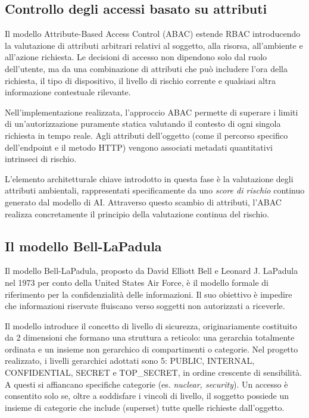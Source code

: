 \subsection{Controllo degli accessi basato su attributi}

Il modello Attribute-Based Access Control (ABAC) estende RBAC introducendo la valutazione di attributi arbitrari relativi al soggetto, alla risorsa, all'ambiente e all'azione richiesta. Le decisioni di accesso non dipendono solo dal ruolo dell'utente, ma da una combinazione di attributi che può includere l'ora della richiesta, il tipo di dispositivo, il livello di rischio corrente e qualsiasi altra informazione contestuale rilevante.

Nell'implementazione realizzata, l'approccio ABAC permette di superare i limiti di un'autorizzazione puramente statica valutando il contesto di ogni singola richiesta in tempo reale. Agli attributi dell'oggetto (come il percorso specifico dell'endpoint e il metodo HTTP) vengono associati metadati quantitativi intrinseci di rischio. 

L'elemento architetturale chiave introdotto in questa fase è la valutazione degli attributi ambientali, rappresentati specificamente da uno \textit{score di rischio} continuo generato dal modello di AI. Attraverso questo scambio di attributi, l'ABAC realizza concretamente il principio della valutazione continua del rischio.

\subsection{Il modello Bell-LaPadula}

Il modello Bell-LaPadula, proposto da David Elliott Bell e Leonard J. LaPadula nel 1973 per conto della United States Air Force, è il modello formale di riferimento per la confidenzialità delle informazioni. Il suo obiettivo è impedire che informazioni riservate fluiscano verso soggetti non autorizzati a riceverle.

Il modello introduce il concetto di livello di sicurezza, originariamente costituito da 2 dimensioni che formano una struttura a reticolo: una gerarchia totalmente ordinata e un insieme non gerarchico di compartimenti o categorie. Nel progetto realizzato, i livelli gerarchici adottati sono 5: PUBLIC, INTERNAL, CONFIDENTIAL, SECRET e TOP\_SECRET, in ordine crescente di sensibilità. A questi si affiancano specifiche categorie (es. \textit{nuclear, security}). Un accesso è consentito solo se, oltre a soddisfare i vincoli di livello, il soggetto possiede un insieme di categorie che include (superset) tutte quelle richieste dall'oggetto.

